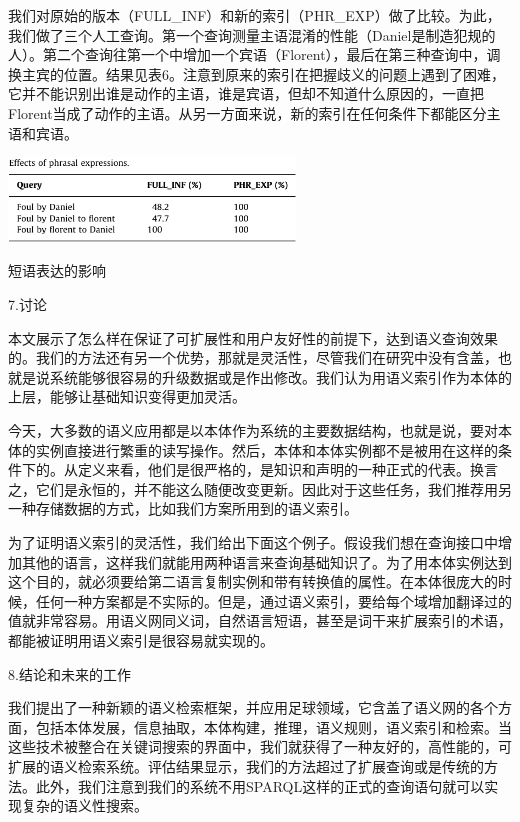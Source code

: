 我们对原始的版本（{\Times FULL\_INF}）和新的索引（{\Times PHR\_EXP}）做了比较。为此，我们做了三个人工查询。第一个查询测量主语混淆的性能（{\Times Daniel}是制造犯规的人）。第二个查询往第一个中增加一个宾语（{\Times Florent}），最后在第三种查询中，调换主宾的位置。结果见表6。注意到原来的索引在把握歧义的问题上遇到了困难，它并不能识别出谁是动作的主语，谁是宾语，但却不知道什么原因的，一直把{\Times Florent}当成了动作的主语。从另一方面来说，新的索引在任何条件下都能区分主语和宾语。
	\begin{table}[htbp] 
	\centering\includegraphics[width=3in]{fig/trans/tab6.png} 
	\caption[]{短语表达的影响}
	\end{table} 

7.讨论

本文展示了怎么样在保证了可扩展性和用户友好性的前提下，达到语义查询效果的。我们的方法还有另一个优势，那就是灵活性，尽管我们在研究中没有含盖，也就是说系统能够很容易的升级数据或是作出修改。我们认为用语义索引作为本体的上层，能够让基础知识变得更加灵活。

今天，大多数的语义应用都是以本体作为系统的主要数据结构，也就是说，要对本体的实例直接进行繁重的读写操作。然后，本体和本体实例都不是被用在这样的条件下的。从定义来看，他们是很严格的，是知识和声明的一种正式的代表。换言之，它们是永恒的，并不能这么随便改变更新。因此对于这些任务，我们推荐用另一种存储数据的方式，比如我们方案所用到的语义索引。

为了证明语义索引的灵活性，我们给出下面这个例子。假设我们想在查询接口中增加其他的语言，这样我们就能用两种语言来查询基础知识了。为了用本体实例达到这个目的，就必须要给第二语言复制实例和带有转换值的属性。在本体很庞大的时候，任何一种方案都是不实际的。但是，通过语义索引，要给每个域增加翻译过的值就非常容易。用语义网同义词，自然语言短语，甚至是词干来扩展索引的术语，都能被证明用语义索引是很容易就实现的。

8.结论和未来的工作

我们提出了一种新颖的语义检索框架，并应用足球领域，它含盖了语义网的各个方面，包括本体发展，信息抽取，本体构建，推理，语义规则，语义索引和检索。当这些技术被整合在关键词搜索的界面中，我们就获得了一种友好的，高性能的，可扩展的语义检索系统。评估结果显示，我们的方法超过了扩展查询或是传统的方法。此外，我们注意到我们的系统不用{\Times SPARQL}这样的正式的查询语句就可以实现复杂的语义性搜索。

